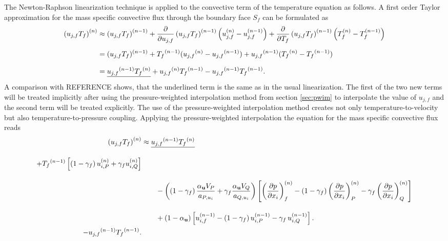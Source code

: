 The Newton-Raphson linearization technique is applied to the convective term of the temperature equation as follows. A first order Taylor approximation for the mass specific convective flux through the boundary face \(S_f\) can be formulated as
\begin{align*}
  \left(u_{j,f} T_f \right)^{(n)} 
  &\approx 
  \left(u_{j,f} T_f \right)^{(n-1)} 
  + \frac{\partial}{\partial u_{j,f}}\left( u_{j,f} T_f \right)^{(n-1)} \left(u_{j,f}^{(n)} - u_{j,f}^{(n-1)} \right) 
  + \frac{\partial}{\partial T_f}\left( u_{j,f} T_f \right)^{(n-1)} \left( T_f^{(n)} - T_f^{(n-1)} \right) \\[0.5em]
  &=
  (u_{j,f} T_f )^{(n-1)} 
  + \vphantom{(u_{j,f} T_f)}{T_f}^{(n-1)} (\vphantom{(u_{j,f} T_f)}{u_{j,f}}^{(n)} - \vphantom{(u_{j,f} T_f)}{u_{j,f}}^{(n-1)} ) 
  +  \vphantom{(u_j T)}{u_{j,f}}^{(n-1)} ( \vphantom{(u_j T)}{T_f}^{(n)} - \vphantom{(u_j T)}{T_f}^{(n-1)} ) \\[0.7em]
  &=
  \underline{\vphantom{(u_j T)}{u_{j,f}}^{(n-1)} \vphantom{(u_{j,f})}{T_f}^{(n)}}  + \vphantom{(u_{j,f} T_f)}{u_{j,f}}^{(n)} \vphantom{(u_jT)}{T_f}^{(n-1)}  -  \vphantom{(u_j T)}{u_{j,f}}^{(n-1)} \vphantom{(u_j T)}{T_f}^{(n-1)}.
\end{align*}
A comparison with REFERENCE shows, that the underlined term is the same as in the usual linearization. The first of the two new terms will be treated implicitly after using the pressure-weighted interpolation method from section \ref{sec:pwim} to interpolate the value of \(u_{j,f}\) and the second term will be treated explicitly. The use of the pressure-weighted interpolation method creates not only temperature-to-velocity but also temperature-to-pressure coupling. Applying the pressure-weighted interpolation the equation for the mass specific convective flux reads
\begin{align*}
  \left(u_{j,f} T_f \right)^{(n)} 
  &\approx 
  \underline{\vphantom{(u_j T)}{u_{j,f}}^{(n-1)} \vphantom{(u_{j,f})}{T_f}^{(n)}}  \\[1em]
  +  \vphantom{(u_jT)}{T_f}^{(n-1)}  \left[\left(1 - \gamma_f\right) u_{i,P}^{(n)} + \gamma_f u_{i,Q}^{(n)} \right] \nonumber\\[1em]
    &\quad\quad - 
    \left(\left(1 - \gamma_f\right) \frac{\alpha_\vec{u} V_P}{a_{P,u_i}} + \gamma_f \frac{\alpha_\vec{u} V_Q}{a_{Q,u_i}}\right)
    \left[ 
    \left(\frac{\partial p}{\partial x_i}\right)_f^{(n)} 
    -  \left(1 - \gamma_f\right) \left( \frac{\partial p}{\partial x_i} \right)_P^{(n)} 
    - \gamma_f \left(\frac{\partial p}{\partial x_i}\right)_Q^{(n)} 
    \right] \nonumber \\[1em]
    &\quad\quad + \left(1 - \alpha_\vec{u}\right) \left[ u_{i,f}^{(n-1)} - \left(1 - \gamma_f\right) u_{i,P}^{(n-1)} - \gamma_f \, u_{i,Q}^{(n-1)} \right]. \\
-  \vphantom{(u_j T)}{u_{j,f}}^{(n-1)} \vphantom{(u_j T)}{T_f}^{(n-1)}. \\
\end{align*}


